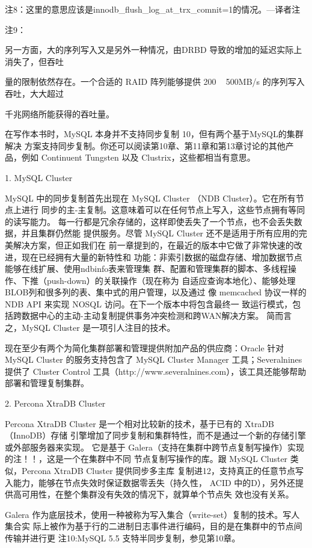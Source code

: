 注8：这里的意思应该是innodb\_flush\_log\_at\_trx\_comnit=1的情况。—译者注

注9：

另一方面，大的序列写入又是另外一种情况，由DRBD 导致的增加的延迟实际上消失了，但吞吐

量的限制依然存在。一个合适的 RAID 阵列能够提供 200 ~ 500MB/s 的序列写入吞吐，大大超过

千兆网络所能获得的吞吐量。

在写作本书时，MySQL 本身并不支持同步复制 10，但有两个基于MySQL的集群解决
方案支持同步复制。你还可以阅读第10章、第11章和第13章讨论的其他产品，例如
Continuent Tungsten 以及 Clustrix，这些都相当有意思。

1. MySQL Cluster

MySQL 中的同步复制首先出现在 MySQL Cluster （NDB Cluster）。它在所有节点上进行
同步的主-主复制。这意味着可以在任何节点上写入，这些节点拥有等同的读写能力。
每一行都是冗余存储的，这样即使丢失了一个节点，也不会丢失数据，并且集群仍然能
提供服务。尽管 MySQL Cluster 还不是适用于所有应用的完美解决方案，但正如我们在
前一章提到的，在最近的版本中它做了非常快速的改进，现在已经拥有大量的新特性和
功能：非索引数据的磁盘存储、增加数据节点能够在线扩展、使用ndbinfo表来管理集
群、配置和管理集群的脚本、多线程操作、下推（push-down）的关联操作（现在称为
自适应查询本地化）、能够处理BLOB列和很多列的表、集中式的用户管理，以及通过
像 memcached 协议一样的 NDB API 来实现 NOSQL 访问。在下一个版本中将包含最终一
致运行模式，包括跨数据中心的主动-主动复制提供事务冲突检测和跨WAN解决方案。
简而言之，MySQL Cluster 是一项引人注目的技术。

现在至少有两个为简化集群部署和管理提供附加产品的供应商：Oracle 针对MySQL
Cluster 的服务支持包含了 MySQL Cluster Manager 工具；Severalnines 提供了 Cluster
Control 工具（http://www.severalnines.com），该工具还能够帮助部署和管理复制集群。

2. Percona XtraDB Cluster

Percona XtraDB Cluster 是一个相对比较新的技术，基于已有的 XtraDB （InnoDB）存储
引擎增加了同步复制和集群特性，而不是通过一个新的存储引擎或外部服务器来实现。
它是基于 Galera（支持在集群中跨节点复制写操作）实现的注！！，这是一个在集群中不同
节点复制写操作的库。跟 MySQL Cluster 类似，Percona XtraDB Cluster 提供同步多主库
复制进12，支持真正的任意节点写入能力，能够在节点失效时保证数据零丢失（持久性，
ACID 中的D），另外还提供高可用性，在整个集群没有失效的情况下，就算单个节点失
效也没有关系。

Galera 作为底层技术，使用一种被称为写入集合（write-set）复制的技术。写人集合实
际上被作为基于行的二进制日志事件进行编码，目的是在集群中的节点间传输并进行更
注10:MySQL 5.5 支特半同步复制，参见第10章。

